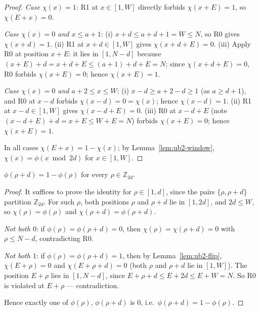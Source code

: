 \begin{proof}
\emph{Case $\chi(x) = 1$}: R1 at $x \in [1, W]$ directly forbids
$\chi(x + E) = 1$, so $\chi(E + x) = 0$.

\emph{Case $\chi(x) = 0$ and $x \le a + 1$}: (i) $x + d \le a + d + 1 = W
\le N$, so R0 gives $\chi(x + d) = 1$. (ii) R1 at $x + d \in [1, W]$ gives
$\chi(x + d + E) = 0$. (iii) Apply R0 at position $x + E$: it lies in
$[1, N-d]$ because $(x + E) + d = x + d + E \le (a+1) + d + E = N$; since
$\chi(x + d + E) = 0$, R0 forbids $\chi(x + E) = 0$; hence
$\chi(x + E) = 1$.

\emph{Case $\chi(x) = 0$ and $a + 2 \le x \le W$}: (i)
$x - d \ge a + 2 - d \ge 1$ (as $a \ge d + 1$), and R0 at $x - d$ forbids
$\chi(x - d) = 0 = \chi(x)$; hence $\chi(x - d) = 1$. (ii) R1 at
$x - d \in [1, W]$ gives $\chi(x - d + E) = 0$. (iii) R0 at $x - d + E$
(note $(x - d + E) + d = x + E \le W + E = N$) forbids $\chi(x + E) = 0$;
hence $\chi(x + E) = 1$.

In all cases $\chi(E + x) = 1 - \chi(x)$; by Lemma~\ref{lem:ub2-window},
$\chi(x) = \phi(x \bmod 2d)$ for $x \in [1, W]$.
\end{proof}

\begin{lemma}\label{lem:ub2-antipodal}
$\phi(\rho + d) = 1 - \phi(\rho)$ for every $\rho \in \mathbb{Z}_{2d}$.
\end{lemma}

\begin{proof}
It suffices to prove the identity for $\rho \in [1, d]$, since the pairs
$\{\rho, \rho + d\}$ partition $\mathbb{Z}_{2d}$. For such $\rho$, both
positions $\rho$ and $\rho + d$ lie in $[1, 2d]$, and $2d \le W$, so
$\chi(\rho) = \phi(\rho)$ and $\chi(\rho + d) = \phi(\rho + d)$.

\emph{Not both $0$}: if $\phi(\rho) = \phi(\rho + d) = 0$, then
$\chi(\rho) = \chi(\rho + d) = 0$ with $\rho \le N - d$, contradicting R0.

\emph{Not both $1$}: if $\phi(\rho) = \phi(\rho + d) = 1$, then by
Lemma~\ref{lem:ub2-flip}, $\chi(E + \rho) = 0$ and
$\chi(E + \rho + d) = 0$ (both $\rho$ and $\rho + d$ lie in $[1, W]$). The
position $E + \rho$ lies in $[1, N - d]$, since
$E + \rho + d \le E + 2d \le E + W = N$. So R0 is violated at $E + \rho$
--- contradiction.

Hence exactly one of $\phi(\rho)$, $\phi(\rho + d)$ is $0$, i.e.\
$\phi(\rho + d) = 1 - \phi(\rho)$.
\end{proof}

